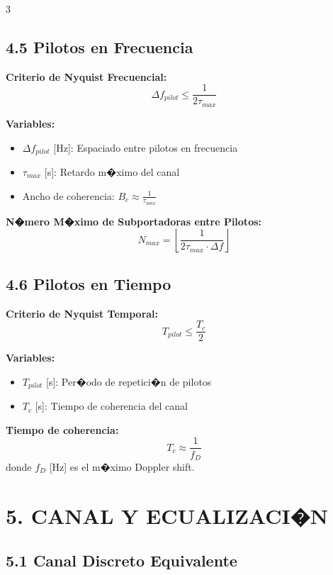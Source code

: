 ﻿\documentclass[8pt,a4paper]{article}
\begin{document}
\begin{multicols}{3}
\vspace{-2mm}
\subsection*{\small 4.5 Pilotos en Frecuencia}
\vspace{-2mm}

\textbf{Criterio de Nyquist Frecuencial:}
\[
\Delta f_{pilot} \leq \frac{1}{2\tau_{max}}
\]

\textbf{Variables:}
\begin{itemize}[leftmargin=*,itemsep=0pt]
    \item $\Delta f_{pilot}$ [Hz]: Espaciado entre pilotos en frecuencia
    \item $\tau_{max}$ [s]: Retardo m�ximo del canal
    \item Ancho de coherencia: $B_c \approx \frac{1}{\tau_{max}}$
\end{itemize}

\textbf{N�mero M�ximo de Subportadoras entre Pilotos:}
\[
N_{max} = \left\lfloor\frac{1}{2\tau_{max} \cdot \Delta f}\right\rfloor
\]

\vspace{-2mm}
\subsection*{\small 4.6 Pilotos en Tiempo}
\vspace{-2mm}

\textbf{Criterio de Nyquist Temporal:}
\[
T_{pilot} \leq \frac{T_c}{2}
\]

\textbf{Variables:}
\begin{itemize}[leftmargin=*,itemsep=0pt]
    \item $T_{pilot}$ [s]: Per�odo de repetici�n de pilotos
    \item $T_c$ [s]: Tiempo de coherencia del canal
\end{itemize}

\textbf{Tiempo de coherencia:}
\[
T_c \approx \frac{1}{f_D}
\]
donde $f_D$ [Hz] es el m�ximo Doppler shift.

\vspace{-2mm}
\section*{\color{sectioncolor}\normalsize 5. CANAL Y ECUALIZACI�N}
\vspace{-3mm}

\subsection*{\small 5.1 Canal Discreto Equivalente}
\vspace{-2mm}


\end{multicols}
\end{document}
